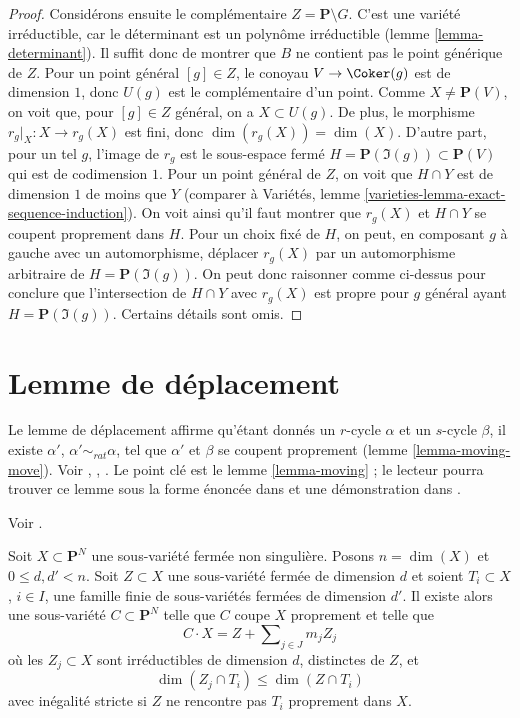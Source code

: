 \begin{proof}
\medskip\noindent
Considérons ensuite le complémentaire $Z = \mathbf{P} \setminus G$.
C'est une variété irréductible, car le déterminant est un
polynôme irréductible (lemme \ref{lemma-determinant}).
Il suffit donc de montrer que $B$ ne contient pas le
point générique de $Z$. Pour un point général $[g] \in Z$,
le conoyau $V \to \Coker(g)$ est de dimension $1$, donc
$U(g)$ est le complémentaire d'un point. Comme $X \not = \mathbf{P}(V)$,
on voit que, pour $[g] \in Z$ général, on a $X \subset U(g)$.
De plus, le morphisme $r_g|_X : X \to r_g(X)$ est fini, donc
$\dim(r_g(X)) = \dim(X)$.
D'autre part, pour un tel $g$, l'image de $r_g$ est le
sous-espace fermé $H = \mathbf{P}(\Im(g)) \subset \mathbf{P}(V)$
qui est de codimension $1$.
Pour un point général de $Z$, on voit que $H \cap Y$ est de dimension $1$
de moins que $Y$ (comparer à
Variétés, lemme \ref{varieties-lemma-exact-sequence-induction}).
On voit ainsi qu'il faut montrer que $r_g(X)$ et $H \cap Y$
se coupent proprement dans $H$. Pour un choix fixé de $H$, on peut,
en composant $g$ à gauche avec un automorphisme, déplacer $r_g(X)$ par
un automorphisme arbitraire de $H = \mathbf{P}(\Im(g))$.
On peut donc raisonner comme ci-dessus pour conclure que l'intersection
de $H \cap Y$ avec $r_g(X)$ est propre pour $g$ général ayant
$H = \mathbf{P}(\Im(g))$. Certains détails sont omis.
\end{proof}







\section{Lemme de déplacement}
\label{section-moving-lemma}

\noindent
Le lemme de déplacement affirme qu'étant donnés un $r$-cycle $\alpha$ et un $s$-cycle
$\beta$, il existe $\alpha'$, $\alpha' \sim_{rat} \alpha$, tel que
$\alpha'$ et $\beta$ se coupent proprement (lemme \ref{lemma-moving-move}).
Voir \cite{Samuel}, \cite{ChevalleyI}, \cite{ChevalleyII}.
Le point clé est le lemme \ref{lemma-moving} ; le lecteur pourra trouver
ce lemme sous la forme énoncée dans
\cite[exemple 11.4.1]{F} et une démonstration dans \cite{Roberts}.

\begin{lemma}
\label{lemma-moving}
\begin{reference}
Voir \cite{Roberts}.
\end{reference}
Soit $X \subset \mathbf{P}^N$ une sous-variété fermée non singulière.
Posons $n = \dim(X)$ et $0 \leq d, d' < n$. Soit $Z \subset X$ une sous-variété
fermée de dimension $d$ et soient $T_i \subset X$, $i \in I$, une famille finie
de sous-variétés fermées de dimension $d'$. Il existe alors
une sous-variété $C \subset \mathbf{P}^N$ telle que $C$ coupe $X$
proprement et telle que
$$
C \cdot X = Z + \sum\nolimits_{j \in J} m_j Z_j
$$
où les $Z_j \subset X$ sont irréductibles de dimension $d$, distinctes de $Z$, et
$$
\dim(Z_j \cap T_i) \leq \dim(Z \cap T_i)
$$
avec inégalité stricte si $Z$ ne rencontre pas $T_i$ proprement dans $X$.
\end{lemma}

